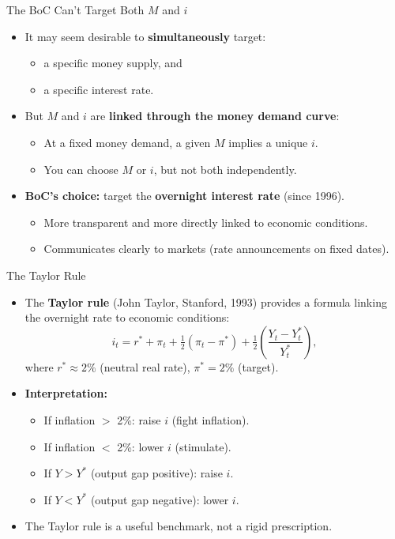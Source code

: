 \documentclass[aspectratio=169]{beamer}
\begin{document}
\begin{frame}{The BoC Can't Target Both $M$ and $i$}
\transfade
\begin{itemize}[<+->]
  \item It may seem desirable to \textbf{simultaneously} target:
  \begin{itemize}[<+->]
    \item a specific money supply, and
    \item a specific interest rate.
  \end{itemize}
  \item But $M$ and $i$ are \textbf{linked through the money demand curve}:
  \begin{itemize}[<+->]
    \item At a fixed money demand, a given $M$ implies a unique $i$.
    \item You can choose $M$ or $i$, but not both independently.
  \end{itemize}
  \item \textbf{BoC's choice:} target the \textbf{overnight interest rate} (since 1996).
  \begin{itemize}[<+->]
    \item More transparent and more directly linked to economic conditions.
    \item Communicates clearly to markets (rate announcements on fixed dates).
  \end{itemize}
\end{itemize}
\end{frame}

\begin{frame}{The Taylor Rule}
\transfade
\begin{itemize}[<+->]
  \item The \textbf{Taylor rule} (John Taylor, Stanford, 1993) provides a formula linking the overnight rate to economic conditions:
  \[
    i_t = r^* + \pi_t + \tfrac{1}{2}(\pi_t - \pi^*) + \tfrac{1}{2}\!\left(\frac{Y_t - Y^*_t}{Y^*_t}\right),
  \]
  where $r^* \approx 2\%$ (neutral real rate), $\pi^* = 2\%$ (target).
  \item \textbf{Interpretation:}
  \begin{itemize}[<+->]
    \item If inflation $>$ 2\%: raise $i$ (fight inflation).
    \item If inflation $<$ 2\%: lower $i$ (stimulate).
    \item If $Y > Y^*$ (output gap positive): raise $i$.
    \item If $Y < Y^*$ (output gap negative): lower $i$.
  \end{itemize}
  \item The Taylor rule is a useful \alert{benchmark}, not a rigid prescription.
\end{itemize}
\end{frame}
\end{document}
